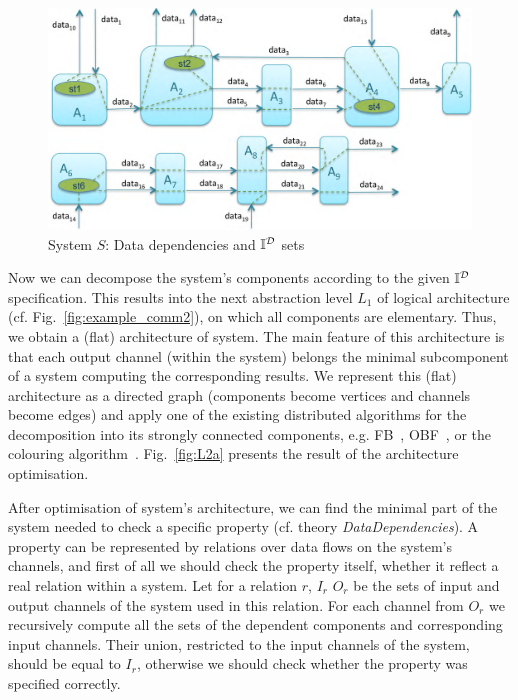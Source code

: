 \begin{figure}[ht!]
  \begin{center}
   \includegraphics[scale=0.15]{fig/L0.pdf}%
   \vspace{-3mm}
    \caption{System  $S$: Data dependencies and $\mathbb{I}^\mathcal{D}$ sets 
    }
    \label{fig:example_comm1}
  \end{center}
\end{figure}
 
 \newpage 
 Now we can decompose the system's components according to the given  $\mathbb{I}^\mathcal{D}$ specification. This results into the next abstraction level $L_{1}$ of logical architecture (cf. Fig.~\ref{fig:example_comm2}), on which all components are elementary. Thus, we obtain a  (flat) architecture of system. 
 The main feature of this architecture is that  each output channel (within the system) 
belongs the minimal subcomponent of a system computing the corresponding results. 
 We represent this (flat) architecture  as a directed graph (components become vertices and channels become edges)  
and apply one of the existing distributed algorithms for the 
decomposition into its   strongly connected components,  e.g. FB~\cite{idetifyingSSCs}, OBF~\cite{OBF}, or the colouring algorithm~\cite{Orzan04ondistributed}.
Fig.~\ref{fig:L2a} presents the result of the architecture optimisation.

After optimisation of system's architecture, we can find the minimal part of the system
needed to check a specific property (cf. theory \emph{DataDependencies}).  
A property can be represented  by relations over data flows on the system's channels, 
and first of all we should check the property itself, whether it reflect a real relation within a system. 
Let for a relation $r$, $I_{r}$ $O_{r}$ be the sets of input and output channels of the system used in this relation.
For each channel from $O_{r}$ we recursively compute all the sets of the dependent components and corresponding 
input channels. 
Their union, restricted to the input channels of the system, 
 should be equal to $I_{r}$, otherwise we should check whether the property was specified correctly. 

